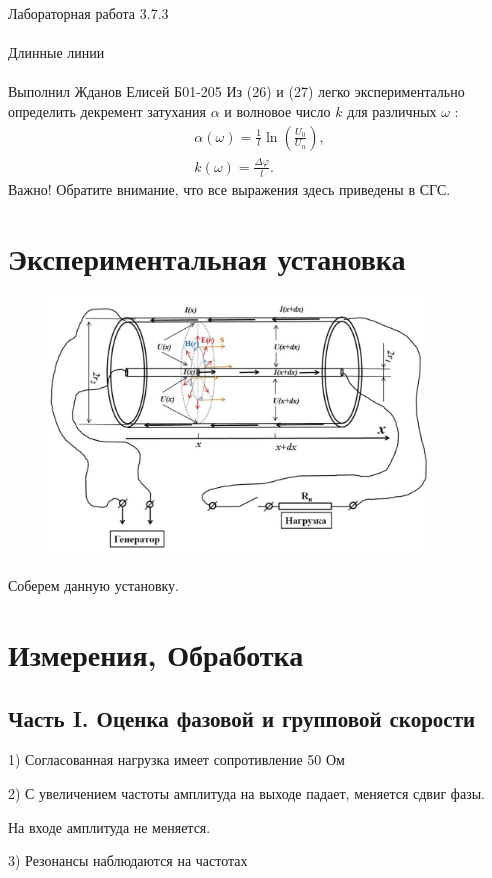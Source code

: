 \documentclass{astroedu-lab}
\begin{document}
\begin{problem}{\huge Лабораторная работа 3.7.3\\\\Длинные линии\\\\Выполнил Жданов Елисей Б01-205}
Из (26) и (27) легко экспериментально определить декремент затухания $\alpha$ и волновое число $k$ для различных $\omega$ :
$$
\begin{gathered}
\alpha(\omega)=\frac{1}{l} \ln \left(\frac{U_0}{U_n}\right), \\
k(\omega)=\frac{\Delta \varphi}{l} .
\end{gathered}
$$
Важно! Обратите внимание, что все выражения здесь приведены в СГС.

\section{Экспериментальная установка}

\begin{figure}[!h]
	\centering
	\includegraphics[width=0.9\textwidth]{установка.png}
	\label{fig:boiler}
\end{figure}

Соберем данную установку.

\section{Измерения, Обработка}

\subsection{Часть I. Оценка фазовой и групповой скорости}

1) Согласованная нагрузка имеет сопротивление 50 Ом

2) С увеличением частоты амплитуда на выходе падает, меняется сдвиг фазы.

На входе амплитуда не меняется.

3) Резонансы наблюдаются на частотах


\end{problem}
\end{document}
